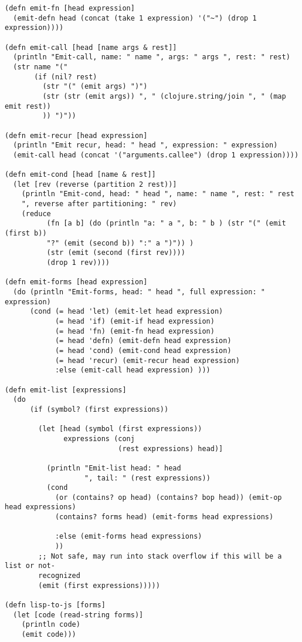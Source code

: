 \begin{verbatim}
(defn emit-fn [head expression]
  (emit-defn head (concat (take 1 expression) '("~") (drop 1 expression))))

(defn emit-call [head [name args & rest]]
  (println "Emit-call, name: " name ", args: " args ", rest: " rest)
  (str name "("
       (if (nil? rest)
         (str "(" (emit args) ")")
         (str (str (emit args)) ", " (clojure.string/join ", " (map emit rest))
         )) ")"))

(defn emit-recur [head expression]
  (println "Emit recur, head: " head ", expression: " expression)
  (emit-call head (concat '("arguments.callee") (drop 1 expression))))

(defn emit-cond [head [name & rest]]
  (let [rev (reverse (partition 2 rest))]
    (println "Emit-cond, head: " head ", name: " name ", rest: " rest 
    ", reverse after partitioning: " rev)
    (reduce
          (fn [a b] (do (println "a: " a ", b: " b ) (str "(" (emit (first b)) 
          "?" (emit (second b)) ":" a ")")) )
          (str (emit (second (first rev))))
          (drop 1 rev))))

(defn emit-forms [head expression]
  (do (println "Emit-forms, head: " head ", full expression: " expression)
      (cond (= head 'let) (emit-let head expression)
            (= head 'if) (emit-if head expression)
            (= head 'fn) (emit-fn head expression)
            (= head 'defn) (emit-defn head expression)
            (= head 'cond) (emit-cond head expression)
            (= head 'recur) (emit-recur head expression)
            :else (emit-call head expression) )))

(defn emit-list [expressions]
  (do
      (if (symbol? (first expressions))

        (let [head (symbol (first expressions))
              expressions (conj
                           (rest expressions) head)]

          (println "Emit-list head: " head
                   ", tail: " (rest expressions))
          (cond
            (or (contains? op head) (contains? bop head)) (emit-op head expressions)
            (contains? forms head) (emit-forms head expressions)

            :else (emit-forms head expressions)
            ))
        ;; Not safe, may run into stack overflow if this will be a list or not-
        recognized
        (emit (first expressions)))))

(defn lisp-to-js [forms]
  (let [code (read-string forms)]
    (println code)
    (emit code)))


\end{verbatim}
